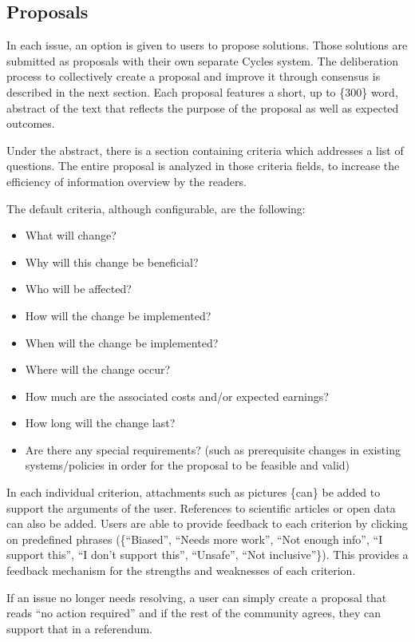 \documentclass[a4paper,11pt]{article}
\begin{document}
\begin{multicols}{2}
\subsection{Proposals} \label{proposals}

In each issue, an option is given to users to propose solutions. Those solutions are submitted as proposals with their own separate Cycles system. The deliberation process to collectively create a proposal and improve it through consensus is described in the next section. Each proposal features a short, up to \{300\} word, abstract of the text that reflects the purpose of the proposal as well as expected outcomes.

Under the abstract, there is a section containing criteria which addresses a list of questions. The entire proposal is analyzed in those criteria fields, to increase the efficiency of information overview by the readers.

The default criteria, although configurable, are the following:

\begin{itemize}
\item What will change?
\item Why will this change be beneficial?
\item Who will be affected?
\item How will the change be implemented?
\item When will the change be implemented?
\item Where will the change occur?
\item How much are the associated costs and/or expected earnings?
\item How long will the change last?
\item Are there any special requirements? (such as prerequisite changes in existing systems/policies in order for the proposal to be feasible and valid)
\end{itemize}

In each individual criterion, attachments such as pictures \{can\} be added to support the arguments of the user. References to scientific articles or open data can also be added. Users are able to provide feedback to each criterion by clicking on predefined phrases (\{“Biased”, “Needs more work”, “Not enough info”, “I support this”, “I don't support this”, “Unsafe”, “Not inclusive”\}). This provides a feedback mechanism for the strengths and weaknesses of each criterion.

If an issue no longer needs resolving, a user can simply create a proposal that reads “no action required” and if the rest of the community agrees, they can support that in a referendum.


\end{multicols}
\end{document}
